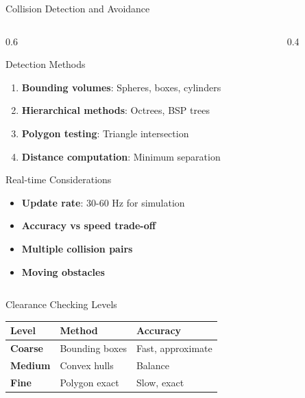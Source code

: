 \documentclass[10pt,aspectratio=169]{beamer}
\begin{document}
\begin{frame}{Collision Detection and Avoidance}
\begin{columns}[T]
\begin{column}{0.6\textwidth}
\begin{block}{Detection Methods}
\begin{enumerate}
\item \textbf{Bounding volumes}: Spheres, boxes, cylinders
\item \textbf{Hierarchical methods}: Octrees, BSP trees
\item \textbf{Polygon testing}: Triangle intersection
\item \textbf{Distance computation}: Minimum separation
\end{enumerate}
\end{block}
\begin{alertblock}{Real-time Considerations}
\begin{itemize}
\item \textbf{Update rate}: 30-60 Hz for simulation
\item \textbf{Accuracy vs speed trade-off}
\item \textbf{Multiple collision pairs}
\item \textbf{Moving obstacles}
\end{itemize}
\end{alertblock}
\end{column}
\begin{column}{0.4\textwidth}
\begin{center}
\end{center}
\end{column}
\end{columns}

\vspace{0.5cm}
\begin{block}{Clearance Checking Levels}
\begin{table}
\centering
\scriptsize
\begin{tabular}{p{}p{}p{}}
\toprule
\textbf{Level} & \textbf{Method} & \textbf{Accuracy} \\
\midrule
\textbf{Coarse} & Bounding boxes & Fast, approximate \\
\textbf{Medium} & Convex hulls & Balance \\
\textbf{Fine} & Polygon exact & Slow, exact \\
\bottomrule
\end{tabular}
\end{table}
\end{block}
\end{frame}
\end{document}
